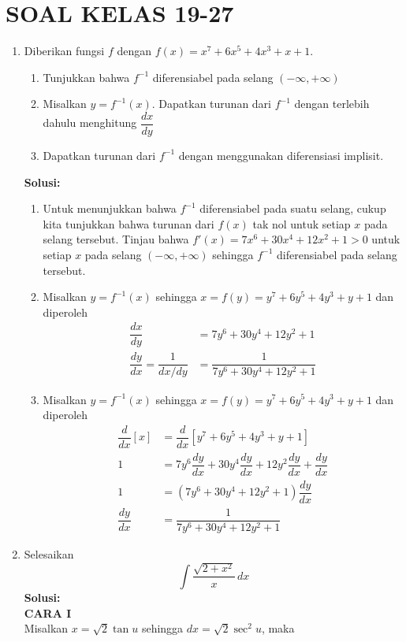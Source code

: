 \documentclass{article}
\begin{document}
\section*{SOAL KELAS 19-27}
\begin{enumerate}
	\item Diberikan fungsi $f$ dengan $f(x)=x^7+6x^5+4x^3+x+1$.
	\begin{enumerate}
		\item Tunjukkan bahwa $f^{-1}$ diferensiabel pada selang $(-\infty,+\infty)$
		\item Misalkan $y=f^{-1}(x)$. Dapatkan turunan dari $f^{-1}$ dengan terlebih dahulu menghitung $\dfrac{dx}{dy}$
		\item Dapatkan turunan dari $f^{-1}$ dengan menggunakan diferensiasi implisit.
	\end{enumerate}
	\textbf{Solusi:}
	\begin{enumerate}
		\item Untuk menunjukkan bahwa $f^{-1}$ diferensiabel pada suatu selang, cukup kita tunjukkan bahwa turunan dari $f(x)$ tak nol untuk setiap $x$ pada selang tersebut. Tinjau bahwa $f'(x)=7x^6+30x^4+12x^2+1>0$ untuk setiap $x$ pada selang $(-\infty,+\infty)$ sehingga $f^{-1}$ diferensiabel pada selang tersebut.
		\item Misalkan $y=f^{-1}(x)$ sehingga $x=f(y)=y^7+6y^5+4y^3+y+1$ dan diperoleh 
		\begin{align*}
		\dfrac{dx}{dy} &= 7y^6+30y^4+12y^2+1\\
		\dfrac{dy}{dx} = \dfrac{1}{dx/dy} &= \dfrac{1}{7y^6+30y^4+12y^2+1}
\end{align*}		
	\item  Misalkan $y=f^{-1}(x)$ sehingga $x=f(y)=y^7+6y^5+4y^3+y+1$ dan diperoleh 
	\begin{align*}
	\dfrac{d}{dx}[x] &= \dfrac{d}{dx}[y^7+6y^5+4y^3+y+1]\\
	1 &= 7y^6\dfrac{dy}{dx}+30y^4\dfrac{dy}{dx}+12y^2\dfrac{dy}{dx}+\dfrac{dy}{dx}\\
	1 &= (7y^6+30y^4+12y^2+1)\dfrac{dy}{dx}\\
	\dfrac{dy}{dx} &= \dfrac{1}{7y^6+30y^4+12y^2+1}
	\end{align*}
	\end{enumerate}
	\item Selesaikan $$ \int \dfrac{\sqrt{2+x^2}}{x}\, dx$$
	\textbf{Solusi:}\\
	\textbf{CARA I}\\
	Misalkan $x=\sqrt{2}\tan u$ sehingga $dx = \sqrt{2}\sec^2 u$, maka
	\begin{align*}

\end{align*}
\end{enumerate}
\end{document}
